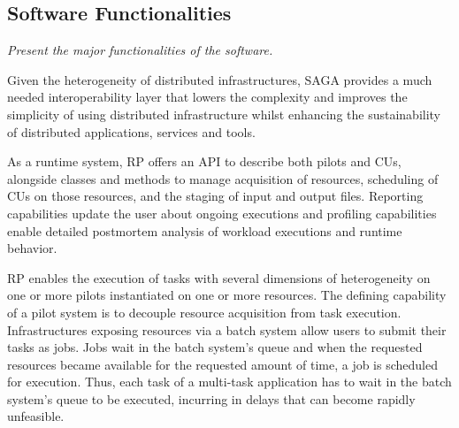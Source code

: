 \documentclass[preprint,12pt, a4paper]{elsarticle}
\begin{document}
\subsection{Software Functionalities}\label{ssec:functionalities}

{\em Present the major functionalities of the software.}


Given the heterogeneity of distributed infrastructures, SAGA provides a much
needed interoperability layer that lowers the complexity and improves the
simplicity of using distributed infrastructure whilst enhancing the
sustainability of distributed applications, services and
tools.

As a runtime system, RP offers an API to describe both pilots and CUs,
alongside classes and methods to manage acquisition of resources, scheduling
of CUs on those resources, and the staging of input and output files.
Reporting capabilities update the user about ongoing executions and profiling
capabilities enable detailed postmortem analysis of workload executions and
runtime behavior.

RP enables the execution of tasks with several dimensions of heterogeneity on
one or more pilots instantiated on one or more resources. The defining
capability of a pilot system is to decouple resource acquisition from task
execution. Infrastructures exposing resources via a batch system allow users
to submit their tasks as jobs. Jobs wait in the batch system's queue and when
the requested resources became available for the requested amount of time, a
job is scheduled for execution. Thus, each task of a multi-task application
has to wait in the batch system's queue to be executed, incurring in delays
that can become rapidly unfeasible.
\end{document}
